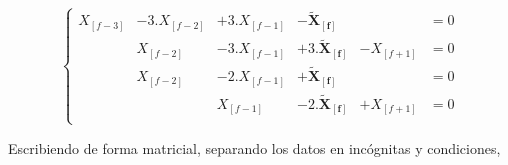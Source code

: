 \begin{equation}
\left\{
\begin{matrix}
X_{[f-3]} &-3.X_{[f-2]} &+3.X_{[f-1]} &-\boldsymbol{\tilde{X}_{[f]}} & &=0 \\
 &X_{[f-2]} &-3.X_{[f-1]} &+3.\boldsymbol{\boldsymbol{\tilde{X}_{[f]}}} &-X_{[f+1]} &=0 \\
 &X_{[f-2]} &-2.X_{[f-1]} &+\boldsymbol{\boldsymbol{\tilde{X}_{[f]}}} & &=0 \\
 & &X_{[f-1]} &-2.\boldsymbol{\boldsymbol{\tilde{X}_{[f]}}} &+X_{[f+1]} &=0 \\
\end{matrix}
\right.
\label{ecuaciones_estimacion_01}
\end{equation}

Escribiendo de forma matricial, separando los datos en incógnitas y condiciones,

